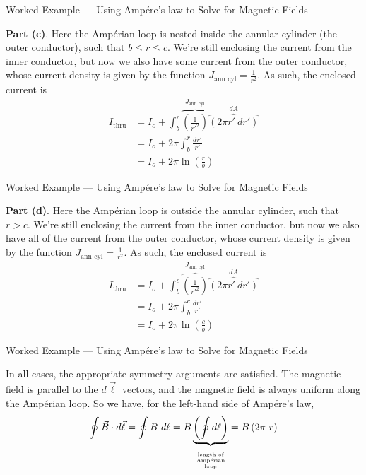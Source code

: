 \documentclass{beamer}
\begin{document}
\begin{frame}{Worked Example --- Using Amp{\'e}re's law to Solve for Magnetic Fields}

\textbf{Part (c)}. Here the Amp{\'e}rian loop is nested inside the annular cylinder (the outer conductor), such that $b \leqslant r \leqslant c$. We're still enclosing the current from the inner conductor, but now we also have some current from the outer conductor, whose current density is given by the function $J_{\text{ann cyl}} = \frac{1}{r^2}$. As such, the enclosed current is
\begin{align*}
    I_{\text{thru}} &= I_o + \int_{b}^{r} \overbrace{\left( \frac{1}{r'^2} \right)}^{J_{\text{ann cyl}}} \overbrace{\left( 2\pi r'\ dr' \right)}^{dA} \\
    &= I_o + 2\pi \int_{b}^{r} \frac{dr'}{r'} \\
    &= I_o + 2\pi \ln{\left( \frac{r}{b} \right)}
\end{align*}

\end{frame}

\begin{frame}{Worked Example --- Using Amp{\'e}re's law to Solve for Magnetic Fields}

\textbf{Part (d)}. Here the Amp{\'e}rian loop is outside the annular cylinder, such that $r > c$. We're still enclosing the current from the inner conductor, but now we also have all of the  current from the outer conductor, whose current density is given by the function $J_{\text{ann cyl}} = \frac{1}{r^2}$. As such, the enclosed current is
\begin{align*}
    I_{\text{thru}} &= I_o + \int_{b}^{c} \overbrace{\left( \frac{1}{r'^2} \right)}^{J_{\text{ann cyl}}} \overbrace{\left( 2\pi r'\ dr' \right)}^{dA} \\
    &= I_o + 2\pi \int_{b}^{c} \frac{dr'}{r'} \\
    &= I_o + 2\pi \ln{\left( \frac{c}{b} \right)}
\end{align*}

\end{frame}

\begin{frame}{Worked Example --- Using Amp{\'e}re's law to Solve for Magnetic Fields}

In all cases, the appropriate symmetry arguments are satisfied. The magnetic field is parallel to the $d\vec{\ell}$ vectors, and the magnetic field is always uniform along the Amp{\'e}rian loop. So we have, for the left-hand side of Amp{\'e}re's law,
\begin{equation*}
    \oint \vec{B} \cdot d\vec{\ell} = \oint B\ d\ell = B \underbrace{\left( \oint d\ell \right)}_{\parbox[c]{3em}{\vspace{-0.5em}\begin{center} \tiny length of Amp{\'e}rian loop \end{center}}} = B \left( 2\pi\ r \right)
\end{equation*}

\end{frame}
\end{document}
